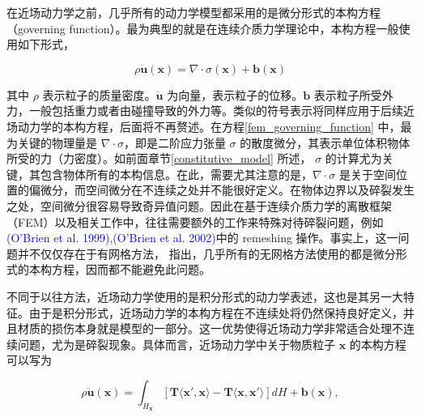 在近场动力学之前，几乎所有的动力学模型都采用的是微分形式的本构方程（governing function）。最为典型的就是在连续介质力学理论中，本构方程一般使用如下形式，

\begin{equation}
\label{fem_governing_function}
\rho\ddot{\mathbf{u}}(\mathbf{x}) = \nabla\cdot\sigma(\mathbf{x})+\mathbf{b}(\mathbf{x})
\end{equation}

其中 $\rho$ 表示粒子的质量密度。$\ddot{\mathbf{u}}$ 为向量，表示粒子的位移。$\mathbf{b}$ 表示粒子所受外力，一般包括重力或者由碰撞导致的外力等。类似的符号表示将同样应用于后续近场动力学的本构方程，后面将不再赘述。在方程\ref{fem_governing_function} 中，最为关键的物理量是 $\nabla\cdot\sigma$，即是二阶应力张量 $\sigma$ 的散度微分，其表示单位体积物体所受的力（力密度）。如前面章节\ref{constitutive_model} 所述， $\sigma$ 的计算尤为关键，其包含物体所有的本构信息。在此，需要尤其注意的是，$\nabla\cdot\sigma$ 是关于空间位置的偏微分，而空间微分在不连续之处并不能很好定义。在物体边界以及碎裂发生之处，空间微分很容易导致奇异值问题。因此在基于连续介质力学的离散框架（FEM）以及相关工作中，往往需要额外的工作来特殊对待碎裂问题，例如\textcolor{blue}{(O'Brien et al. 1999)\parencite{OBrien1999}},\textcolor{blue}{(O'Brien et al. 2002)\parencite{OBrien2002}}中的 remeshing 操作。事实上，这一问题并不仅仅存在于有网格方法， 指出，几乎所有的无网格方法使用的都是微分形式的本构方程，因而都不能避免此问题。

不同于以往方法，近场动力学使用的是积分形式的动力学表述，这也是其另一大特征。由于是积分形式，近场动力学的本构方程在不连续处将仍然保持良好定义，并且材质的损伤本身就是模型的一部分。这一优势使得近场动力学非常适合处理不连续问题，尤为是碎裂现象。具体而言，近场动力学中关于物质粒子 $\mathbf{x}$ 的本构方程可以写为

\begin{equation}
\rho\ddot{\mathbf{u}}(\mathbf{x}) = \int_{H_\mathbf{x}}[\mathbf{T}\langle\mathbf{x}',\mathbf{x}\rangle - \mathbf{T}\langle\mathbf{x},\mathbf{x}'\rangle]dH+\mathbf{b}(\mathbf{x}),
\label{pdm_governing_function}
\end{equation}

